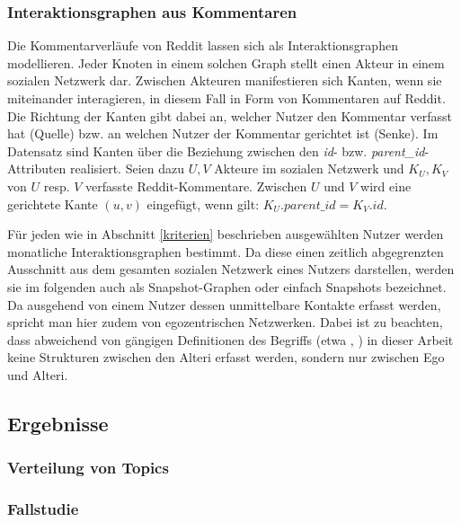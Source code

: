 \documentclass[11pt,a4paper,twoside]{article}
\begin{document}
\hypertarget{interaktionsgraphen-aus-kommentaren}{%
\subsubsection{Interaktionsgraphen aus
Kommentaren}\label{interaktionsgraphen-aus-kommentaren}}

Die Kommentarverläufe von Reddit lassen sich als Interaktionsgraphen
modellieren. Jeder Knoten in einem solchen Graph stellt einen Akteur in
einem sozialen Netzwerk dar. Zwischen Akteuren manifestieren sich
Kanten, wenn sie miteinander interagieren, in diesem Fall in Form von
Kommentaren auf Reddit. Die Richtung der Kanten gibt dabei an, welcher
Nutzer den Kommentar verfasst hat (Quelle) bzw. an welchen Nutzer der
Kommentar gerichtet ist (Senke). Im Datensatz sind Kanten über die
Beziehung zwischen den \emph{id}- bzw. \emph{parent\_id}-Attributen
realisiert. Seien dazu \(U, V\) Akteure im sozialen Netzwerk und
\(K_U, K_V\) von \(U\) resp. \(V\) verfasste Reddit-Kommentare. Zwischen
\(U\) und \(V\) wird eine gerichtete Kante \((u,v)\) eingefügt, wenn
gilt: \(K_{U}.parent\_id = K_{V}.id\).

Für jeden wie in Abschnitt \ref{kriterien} beschrieben ausgewählten
Nutzer werden monatliche Interaktionsgraphen bestimmt. Da diese einen
zeitlich abgegrenzten Ausschnitt aus dem gesamten sozialen Netzwerk
eines Nutzers darstellen, werden sie im folgenden auch als
Snapshot-Graphen oder einfach Snapshots bezeichnet. Da ausgehend von
einem Nutzer dessen unmittelbare Kontakte erfasst werden, spricht man
hier zudem von egozentrischen Netzwerken. Dabei ist zu beachten, dass
abweichend von gängigen Definitionen des Begriffs (etwa \autocite[S.
42]{Wasserman1994}, \autocite{Wolf2010}) in dieser Arbeit keine
Strukturen zwischen den Alteri erfasst werden, sondern nur zwischen Ego
und Alteri.

\hypertarget{ergebnisse}{%
\subsection{Ergebnisse}\label{ergebnisse}}

\hypertarget{verteilung-von-topics}{%
\subsubsection{Verteilung von Topics}\label{verteilung-von-topics}}

\hypertarget{fallstudie}{%
\subsubsection{Fallstudie}\label{fallstudie}}
\end{document}
